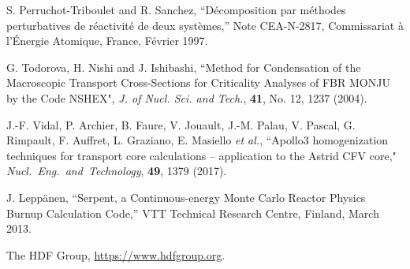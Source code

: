 \begin{thebibliography}{99}
S. Perruchot-Triboulet and R. Sanchez, ``D\'ecomposition par m\'ethodes perturbatives de r\'eactivit\'e de deux syst\`emes,'' Note CEA-N-2817, Commissariat \`a l'\'Energie Atomique, France, F\'evrier 1997.

G. Todorova, H. Nishi and J. Ishibashi, ``Method for Condensation of the Macroscopic Transport Cross-Sections for Criticality Analyses of FBR MONJU by the Code NSHEX", {\sl J. of Nucl. Sci. and Tech.},
{\bf 41}, No. 12, 1237 (2004).

J.-F. Vidal, P. Archier, B. Faure, V. Jouault, J.-M. Palau, V. Pascal, G. Rimpault, F. Auffret, L. Graziano, E. Masiello {\sl et al.}, ``Apollo3
homogenization techniques for transport core calculations -- application to the Astrid CFV core," {\sl Nucl.~Eng.~and~Technology}, {\bf 49}, 1379 (2017).

J. Lepp\"anen, ``Serpent, a Continuous-energy Monte Carlo Reactor Physics Burnup Calculation Code,'' VTT Technical Research Centre, Finland, March 2013.

The HDF Group, \url{https://www.hdfgroup.org}.

\end{thebibliography}
